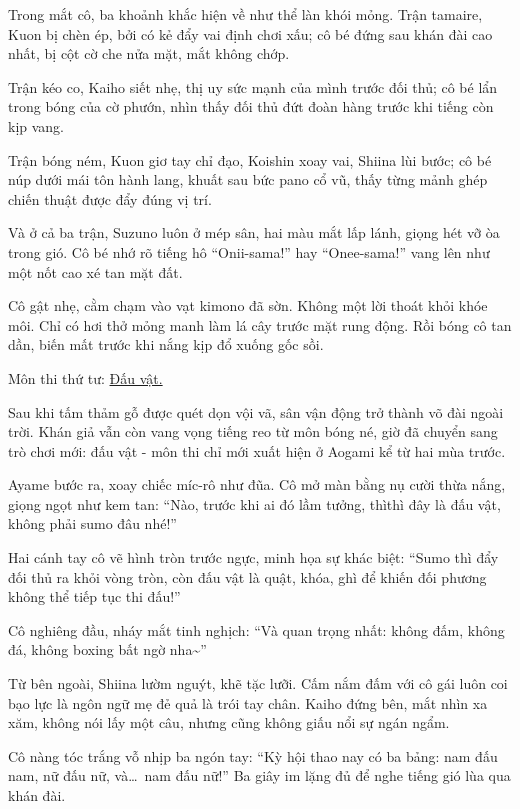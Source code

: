 \documentclass[../main.tex]{subfiles}
\begin{document}
Trong mắt cô, ba khoảnh khắc hiện về như thể làn khói mỏng. Trận tamaire, Kuon bị chèn ép, bởi có kẻ đẩy vai định chơi xấu; cô bé đứng sau khán đài cao nhất, bị cột cờ che nửa mặt, mắt không chớp.

Trận kéo co, Kaiho siết nhẹ, thị uy sức mạnh của mình trước đối thủ; cô bé lẩn trong bóng của cờ phướn, nhìn thấy đối thủ đứt đoàn hàng trước khi tiếng còn kịp vang.

Trận bóng ném, Kuon giơ tay chỉ đạo, Koishin xoay vai, Shiina lùi bước; cô bé núp dưới mái tôn hành lang, khuất sau bức pano cổ vũ, thấy từng mảnh ghép chiến thuật được đẩy đúng vị trí.

Và ở cả ba trận, Suzuno luôn ở mép sân, hai màu mắt lấp lánh, giọng hét vỡ òa trong gió. Cô bé nhớ rõ tiếng hô ``Onii-sama!'' hay ``Onee-sama!'' vang lên như một nốt cao xé tan mặt đất.

Cô gật nhẹ, cằm chạm vào vạt kimono đã sờn. Không một lời thoát khỏi khóe môi. Chỉ có hơi thở mỏng manh làm lá cây trước mặt rung động. Rồi bóng cô tan dần, biến mất trước khi nắng kịp đổ xuống gốc sồi.

\il

\begin{center}
  {\color{vol} Môn thi thứ tư: \uline{Đấu vật.}}
\end{center}

Sau khi tấm thảm gỗ được quét dọn vội vã, sân vận động trở thành võ đài ngoài trời. Khán giả vẫn còn vang vọng tiếng reo từ môn bóng né, giờ đã chuyển sang trò chơi mới: đấu vật - môn thi chỉ mới xuất hiện ở Aogami kể từ hai mùa trước.

Ayame bước ra, xoay chiếc míc-rô như đũa. Cô mở màn bằng nụ cười thừa nắng, giọng ngọt như kem tan: ``Nào, trước khi ai đó lầm tưởng, thìthì đây là đấu vật, không phải sumo đâu nhé!''

Hai cánh tay cô vẽ hình tròn trước ngực, minh họa sự khác biệt: ``Sumo thì đẩy đối thủ ra khỏi vòng tròn, còn đấu vật là quật, khóa, ghì để khiến đối phương không thể tiếp tục thi đấu!''

Cô nghiêng đầu, nháy mắt tinh nghịch: ``Và quan trọng nhất: không đấm, không đá, không boxing bất ngờ nha\~{}''

Từ bên ngoài, Shiina lườm nguýt, khẽ tặc lưỡi. Cấm nắm đấm với cô gái luôn coi bạo lực là ngôn ngữ mẹ đẻ quả là trói tay chân. Kaiho đứng bên, mắt nhìn xa xăm, không nói lấy một câu, nhưng cũng không giấu nổi sự ngán ngẩm.

Cô nàng tóc trắng vỗ nhịp ba ngón tay: ``Kỳ hội thao nay có ba bảng: nam đấu nam, nữ đấu nữ, và\dots\ nam đấu nữ!'' Ba giây im lặng đủ để nghe tiếng gió lùa qua khán đài.
\end{document}
